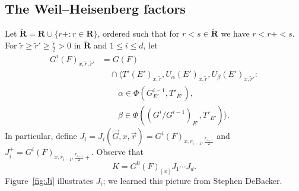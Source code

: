 \documentclass[reqno]{amsart}
\numberwithin{equation}{subsection}
\newcommand{\RR}{\mathbf{R}}
\newcommand{\wt}[1]{\widetilde{#1}}
\newcommand{\co}{\colon}
\theoremstyle{remark}
\numberwithin{equation}{subsection}
\numberwithin{figure}{subsection}
\begin{document}











\subsection{The Weil--Heisenberg factors}\label{sss:yu-heisenberg-weil}
Let $\wt\RR = \RR \cup \{r+\co r \in \RR\}$, ordered such that for $r < s \in \wt\RR$ we have $r < r+ < s$. For $\wt r \geq \wt r' \geq \frac{\wt r}{2} > 0$ in $\wt\RR$ and $1 \leq i\leq d$, let
\begin{align*}
G^i(F)_{x,\wt r, \wt r'} &= G(F) \\
&\quad\cap \langle T'(E')_{x,\wt r}, U_\alpha(E')_{x,\wt r}, U_\beta(E')_{x,\wt r'}\co \\
&\qquad \alpha \in \Phi(G^{i-1}_{E'}, T'_{E'}), \\
&\qquad \beta \in \Phi((G^i/G^{i-1})_{E'}, T'_{E'}) \rangle.
\end{align*}
In particular, define $J_i = J_i(\vec{G},x,\vec{r}) = G^i(F)_{x,r_{i-1}, \frac{r_{i-1}}{2}}$ and $J_i^+ = G^i(F)_{x,r_{i-1},\frac{r_{i-1}}{2}+}$. Observe that
\[
K = G^0(F)_{[x]}J_1 \cdots J_d.
\]
Figure~\ref{fig:Ji} illustrates $J_i$; we learned this picture from Stephen DeBacker.
\end{document}
